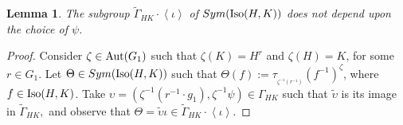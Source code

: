 \documentclass[a4paper,12pt]{article}
\newtheorem{lem}[thm]{Lemma}
\def\aut {{\rm Aut}}
\def\Iso {{\rm Iso}}
\begin{document}
{\begin{lem}\label{carmo} The subgroup $\widetilde\Gamma_{HK} \cdot  \left\langle  \iota \right\rangle$ of $Sym(\Iso(H, K))$ does not depend upon the choice of $\psi$.
\end{lem}

\begin{proof} Consider $\zeta \in \aut(G_1)$ such that $\zeta(K)=H^{r}$ and $\zeta(H)=K$, for some $r\in G_1$. Let $\Theta \in Sym(\Iso(H,K))$ such that  $\Theta(f):=\tau_{_{\zeta^{-1}(r^{-1})}}\left(f^{-1}\right)^{\zeta}$, where $f \in \Iso(H, K)$. Take $\upsilon=(\zeta^{-1}(r^{-1}  \cdot g_1), \zeta^{-1}\psi) \in \Gamma_{HK}$ such that $\tilde{\upsilon}$ is its image in $\widetilde\Gamma_{HK},$ and observe that $\Theta=\tilde{\upsilon} \iota \in \widetilde\Gamma_{HK} \cdot \left\langle \iota\right\rangle.$
\end{proof}






}
\end{document}
